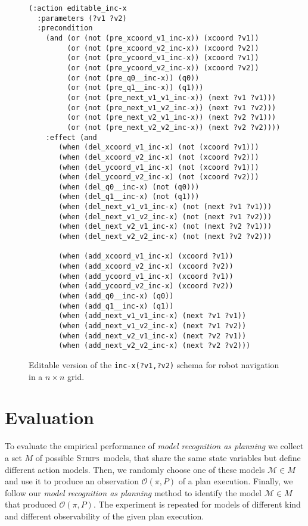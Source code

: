\documentclass[letterpaper]{article} %
\newcommand{\strips}{\textsc{Strips}}     %
\begin{document}
\begin{figure}
  \begin{tiny}  
  \begin{verbatim}
(:action editable_inc-x
  :parameters (?v1 ?v2)
  :precondition
    (and (or (not (pre_xcoord_v1_inc-x)) (xcoord ?v1))
         (or (not (pre_xcoord_v2_inc-x)) (xcoord ?v2))
         (or (not (pre_ycoord_v1_inc-x)) (xcoord ?v1))                       
         (or (not (pre_ycoord_v2_inc-x)) (xcoord ?v2))
         (or (not (pre_q0__inc-x)) (q0))
         (or (not (pre_q1__inc-x)) (q1)))
         (or (not (pre_next_v1_v1_inc-x)) (next ?v1 ?v1)))
         (or (not (pre_next_v1_v2_inc-x)) (next ?v1 ?v2)))
         (or (not (pre_next_v2_v1_inc-x)) (next ?v2 ?v1)))
         (or (not (pre_next_v2_v2_inc-x)) (next ?v2 ?v2))))
    :effect (and
       (when (del_xcoord_v1_inc-x) (not (xcoord ?v1)))
       (when (del_xcoord_v2_inc-x) (not (xcoord ?v2)))
       (when (del_ycoord_v1_inc-x) (not (xcoord ?v1)))
       (when (del_ycoord_v2_inc-x) (not (xcoord ?v2)))
       (when (del_q0__inc-x) (not (q0)))
       (when (del_q1__inc-x) (not (q1)))
       (when (del_next_v1_v1_inc-x) (not (next ?v1 ?v1)))
       (when (del_next_v1_v2_inc-x) (not (next ?v1 ?v2)))
       (when (del_next_v2_v1_inc-x) (not (next ?v2 ?v1)))
       (when (del_next_v2_v2_inc-x) (not (next ?v2 ?v2)))
       
       (when (add_xcoord_v1_inc-x) (xcoord ?v1))
       (when (add_xcoord_v2_inc-x) (xcoord ?v2))
       (when (add_ycoord_v1_inc-x) (xcoord ?v1))
       (when (add_ycoord_v2_inc-x) (xcoord ?v2))
       (when (add_q0__inc-x) (q0))
       (when (add_q1__inc-x) (q1))
       (when (add_next_v1_v1_inc-x) (next ?v1 ?v1))
       (when (add_next_v1_v2_inc-x) (next ?v1 ?v2))
       (when (add_next_v2_v1_inc-x) (next ?v2 ?v1))
       (when (add_next_v2_v2_inc-x) (next ?v2 ?v2)))
  \end{verbatim}           
  \end{tiny}  
 \caption{\small Editable version of the {\tt\small inc-x(?v1,?v2)} schema for robot navigation in a $n\times n$ grid.}
\label{fig:editable}
\end{figure}



\section{Evaluation}
\label{sec:evaluation}
To evaluate the empirical performance of {\em model recognition as planning} we collect a set $M$ of possible \strips\ models, that share the same state variables but define different action models. Then, we randomly choose one of these models $\mathcal{M}\in M$ and use it to produce an observation $\mathcal{O}(\pi,P)$ of a plan execution. Finally, we follow our {\em model recognition as planning} method to identify the model $\mathcal{M}\in M$ that produced $\mathcal{O}(\pi,P)$. The experiment is repeated for models of different kind and different observability of the given plan execution.
\end{document}
